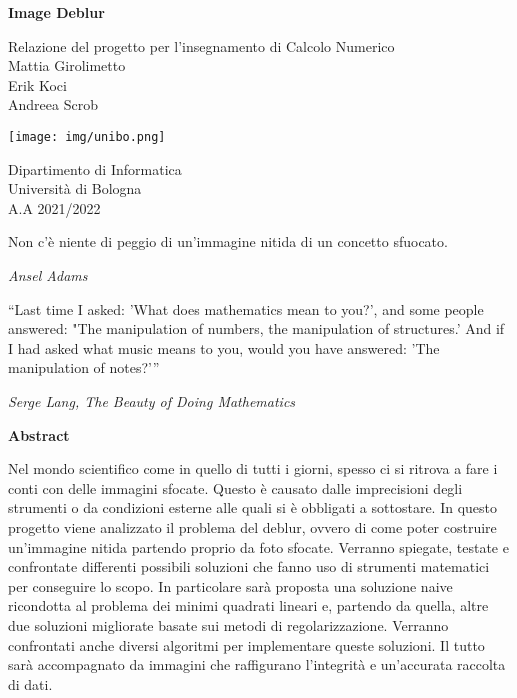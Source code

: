 \documentclass{article}
\begin{document}
\begin{titlepage}

    \begin{center}
        \vspace*{1cm}
        \Huge
        \textbf{Image Deblur}
            
        \vspace{0.5cm}
        \LARGE
         Relazione del progetto per l'insegnamento di Calcolo Numerico\\
        
            
        \vspace{1.5cm}
        \vfill
        Mattia Girolimetto \\Erik Koci \\Andreea Scrob \\
            
        \vspace{0.8cm}
            
        \texttt{[image: img/unibo.png]}
            
        \Large
        Dipartimento di Informatica\\
        Università di Bologna\\
        A.A 2021/2022\\
            
    \end{center}
\end{titlepage}

\epigraph{Non c’è niente di peggio di un’immagine nitida di un concetto sfuocato.}
{\textit{Ansel Adams}}

\epigraph{“Last time I asked: 'What does mathematics mean to you?', and some people answered: "The manipulation of numbers, the manipulation of structures.' And if I had asked what music means to you, would you have answered: 'The manipulation of notes?'”}
{\textit{Serge Lang, The Beauty of Doing Mathematics }}

\newpage

\begin{center}
\textbf{Abstract}
\end{center}
Nel mondo scientifico come in quello di tutti i giorni, spesso ci si ritrova a fare i conti con delle immagini sfocate.
Questo è causato dalle imprecisioni degli strumenti o da condizioni esterne alle quali si è obbligati a sottostare.
In questo progetto viene analizzato il problema del deblur, ovvero di come poter costruire un'immagine nitida partendo proprio da foto sfocate. Verranno spiegate, testate e confrontate differenti possibili soluzioni che fanno uso di strumenti matematici per conseguire lo scopo. In particolare sarà proposta una soluzione naive ricondotta al problema dei minimi quadrati lineari e, partendo da quella, altre due soluzioni migliorate basate sui metodi di regolarizzazione.
Verranno confrontati anche diversi algoritmi per implementare queste soluzioni. Il tutto sarà accompagnato da immagini che raffigurano l'integrità e un'accurata raccolta di dati.
\end{document}

